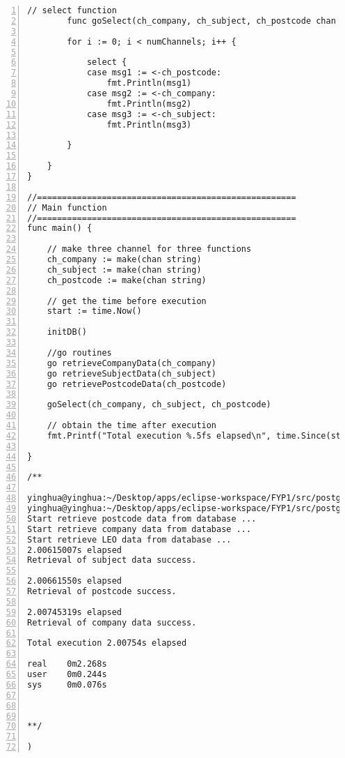 \begin{lstlisting}[breaklines, frame=single, numbers=left, caption={Golang Concurrent Program Source Code}, label=commandline-02]
		// select function
		func goSelect(ch_company, ch_subject, ch_postcode chan string) {
		
		for i := 0; i < numChannels; i++ {
		
			select {
			case msg1 := <-ch_postcode:
				fmt.Println(msg1)
			case msg2 := <-ch_company:
				fmt.Println(msg2)
			case msg3 := <-ch_subject:
				fmt.Println(msg3)
		
		}
	
	}
}

//====================================================
// Main function
//====================================================
func main() {
	
	// make three channel for three functions
	ch_company := make(chan string)
	ch_subject := make(chan string)
	ch_postcode := make(chan string)
	
	// get the time before execution
	start := time.Now()
	
	initDB()
	
	//go routines
	go retrieveCompanyData(ch_company)
	go retrieveSubjectData(ch_subject)
	go retrievePostcodeData(ch_postcode)
	
	goSelect(ch_company, ch_subject, ch_postcode)
	
	// obtain the time after execution
	fmt.Printf("Total execution %.5fs elapsed\n", time.Since(start).Seconds())

}

/**

yinghua@yinghua:~/Desktop/apps/eclipse-workspace/FYP1/src/postgres-process$ go build concurrent-psql.go
yinghua@yinghua:~/Desktop/apps/eclipse-workspace/FYP1/src/postgres-process$ time go run concurrent-psql.go
Start retrieve postcode data from database ...
Start retrieve company data from database ...
Start retrieve LEO data from database ...
2.00615007s elapsed
Retrieval of subject data success.

2.00661550s elapsed
Retrieval of postcode success.

2.00745319s elapsed
Retrieval of company data success.

Total execution 2.00754s elapsed

real	0m2.268s
user	0m0.244s
sys		0m0.076s



**/

)

\end{lstlisting}

